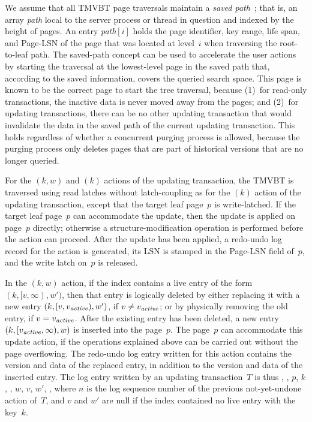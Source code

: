 We assume that all TMVBT page traversals maintain a \emph{saved
path}\label{def:saved-path}~\cite{lomet:1992:conc-rec,lomet:1997:concurrency};
that is, an array \emph{path} local to the server process or thread in
question and indexed by the height of pages.
An entry \emph{path}$[i]$ holds the page identifier, key range, life span,
and Page-LSN of the page that was located at level~$i$ when traversing the
root-to-leaf path.
The saved-path concept can be used to accelerate the user actions by starting
the traversal at the lowest-level page in the saved path that, according to
the saved information, covers the queried search space.
This page is known to be the correct page to start the tree
traversal, because 
(1)~for read-only transactions, the inactive data is never moved away
from the pages; and 
(2)~for updating transactions, there can be no other updating
transaction that would invalidate the data in the saved path of the
current updating transaction.
This holds regardless of whether a concurrent purging process is allowed,
because the purging process only deletes pages that are part of
historical versions that are no longer queried.

For the $(k,w)$ and $(k)$ actions of the
updating transaction, the TMVBT is traversed using read latches without
latch-coupling as for the $(k)$ action of the updating
transaction, except that the target leaf page~$p$ is write-latched.
If the target leaf page~$p$ can accommodate the update, then the update is
applied on page~$p$ directly; otherwise a structure-modification operation
is performed before the action can proceed.
After the update has been applied, a redo-undo log record for the action
is generated, its LSN is stamped in the Page-LSN field of~$p$, and the
write latch on~$p$ is released.

In the $(k,w)$ action, if the index contains a live entry
of the form $(k,[v,\infty),w')$, then that entry is logically deleted by
either replacing it with a new entry $(k,[v,\smash{v_{\text{\textit{active}}}}),w')$, if $v \neq
\smash{v_{\text{\textit{active}}}}$; or by physically removing the old entry, if $v = \smash{v_{\text{\textit{active}}}}$.
After the existing entry has been deleted, a new entry
$(k,[\smash{v_{\text{\textit{active}}}},\infty),w)$ is inserted into the page~$p$. 
The page~$p$ can accommodate this update action, if the operations explained
above can be carried out without the page overflowing.
The redo-undo log entry written for this action contains the version and data
of the replaced entry, in addition to the version and data of the inserted
entry.
The log entry written by an updating transaction~$T$ is thus
, , $p$, $k$, \actver, $w$, $v$, $w'$, , where
$n$ is the log sequence number of the previous not-yet-undone action
of~$T$, and $v$ and $w'$ are null if the index contained no live entry with
the key~$k$.
 
